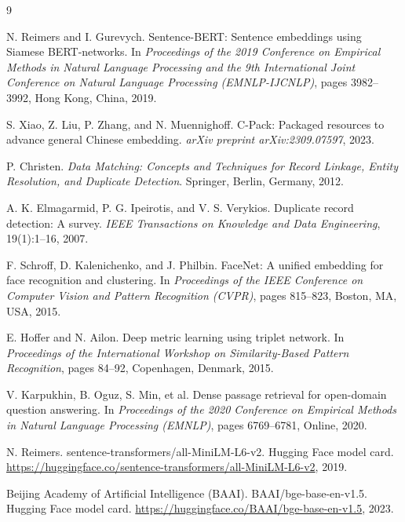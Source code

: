 \documentclass{article}
\begin{document}

\begin{thebibliography}{9}

N. Reimers and I. Gurevych.
\newblock Sentence-BERT: Sentence embeddings using Siamese BERT-networks.
\newblock In \emph{Proceedings of the 2019 Conference on Empirical Methods in Natural Language Processing and the 9th International Joint Conference on Natural Language Processing (EMNLP-IJCNLP)}, pages 3982--3992, Hong Kong, China, 2019.

S. Xiao, Z. Liu, P. Zhang, and N. Muennighoff.
\newblock C-Pack: Packaged resources to advance general Chinese embedding.
\newblock \emph{arXiv preprint arXiv:2309.07597}, 2023.

P. Christen.
\newblock \emph{Data Matching: Concepts and Techniques for Record Linkage, Entity Resolution, and Duplicate Detection}.
\newblock Springer, Berlin, Germany, 2012.

A. K. Elmagarmid, P. G. Ipeirotis, and V. S. Verykios.
\newblock Duplicate record detection: A survey.
\newblock \emph{IEEE Transactions on Knowledge and Data Engineering}, 19(1):1--16, 2007.

F. Schroff, D. Kalenichenko, and J. Philbin.
\newblock FaceNet: A unified embedding for face recognition and clustering.
\newblock In \emph{Proceedings of the IEEE Conference on Computer Vision and Pattern Recognition (CVPR)}, pages 815--823, Boston, MA, USA, 2015.

E. Hoffer and N. Ailon.
\newblock Deep metric learning using triplet network.
\newblock In \emph{Proceedings of the International Workshop on Similarity-Based Pattern Recognition}, pages 84--92, Copenhagen, Denmark, 2015.

V. Karpukhin, B. Oguz, S. Min, et al.
\newblock Dense passage retrieval for open-domain question answering.
\newblock In \emph{Proceedings of the 2020 Conference on Empirical Methods in Natural Language Processing (EMNLP)}, pages 6769--6781, Online, 2020.

N. Reimers.
\newblock sentence-transformers/all-MiniLM-L6-v2.
\newblock Hugging Face model card. \url{https://huggingface.co/sentence-transformers/all-MiniLM-L6-v2}, 2019.

Beijing Academy of Artificial Intelligence (BAAI).
\newblock BAAI/bge-base-en-v1.5.
\newblock Hugging Face model card. \url{https://huggingface.co/BAAI/bge-base-en-v1.5}, 2023.

\end{thebibliography}
\end{document}

